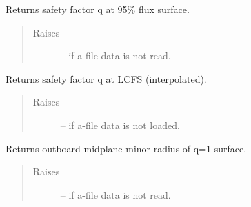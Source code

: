 \documentclass[letterpaper,10pt,english]{sphinxmanual}
\begin{document}
\begin{fulllineitems}
\begin{fulllineitems}
\end{fulllineitems}


\begin{fulllineitems}
\label{eqtools:eqtools.eqdskreader.EqdskReader.getQ95}
Returns safety factor q at 95\% flux surface.
\begin{quote}\begin{description}
\item[{Raises}] \leavevmode
{} -- 
if a-file data is not read.

\end{description}\end{quote}

\end{fulllineitems}


\begin{fulllineitems}
\label{eqtools:eqtools.eqdskreader.EqdskReader.getQLCFS}
Returns safety factor q at LCFS (interpolated).
\begin{quote}\begin{description}
\item[{Raises}] \leavevmode
{} -- 
if a-file data is not loaded.

\end{description}\end{quote}

\end{fulllineitems}


\begin{fulllineitems}
\label{eqtools:eqtools.eqdskreader.EqdskReader.getQ1Surf}
Returns outboard-midplane minor radius of q=1 surface.
\begin{quote}\begin{description}
\item[{Raises}] \leavevmode
{} -- 
if a-file data is not read.

\end{description}\end{quote}

\end{fulllineitems}


\end{fulllineitems}
\end{document}
